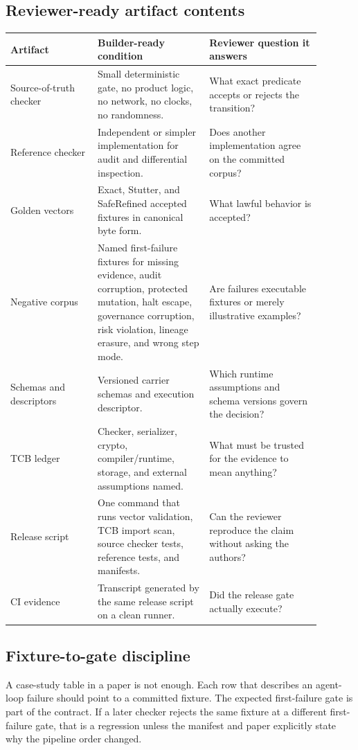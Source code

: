 \documentclass[11pt,oneside]{article}
\begin{document}
\subsection{Reviewer-ready artifact contents}
\begin{longtable}{@{}p{0.25\linewidth}p{0.32\linewidth}p{0.32\linewidth}@{}}
\toprule
\textbf{Artifact} & \textbf{Builder-ready condition} & \textbf{Reviewer question it answers} \\
\midrule
Source-of-truth checker & Small deterministic gate, no product logic, no network, no clocks, no randomness. & What exact predicate accepts or rejects the transition? \\
Reference checker & Independent or simpler implementation for audit and differential inspection. & Does another implementation agree on the committed corpus? \\
Golden vectors & Exact, Stutter, and SafeRefined accepted fixtures in canonical byte form. & What lawful behavior is accepted? \\
Negative corpus & Named first-failure fixtures for missing evidence, audit corruption, protected mutation, halt escape, governance corruption, risk violation, lineage erasure, and wrong step mode. & Are failures executable fixtures or merely illustrative examples? \\
Schemas and descriptors & Versioned carrier schemas and execution descriptor. & Which runtime assumptions and schema versions govern the decision? \\
TCB ledger & Checker, serializer, crypto, compiler/runtime, storage, and external assumptions named. & What must be trusted for the evidence to mean anything? \\
Release script & One command that runs vector validation, TCB import scan, source checker tests, reference tests, and manifests. & Can the reviewer reproduce the claim without asking the authors? \\
CI evidence & Transcript generated by the same release script on a clean runner. & Did the release gate actually execute? \\
\bottomrule
\end{longtable}

\subsection{Fixture-to-gate discipline}
A case-study table in a paper is not enough. Each row that describes an agent-loop failure should point to a committed fixture. The expected first-failure gate is part of the contract. If a later checker rejects the same fixture at a different first-failure gate, that is a regression unless the manifest and paper explicitly state why the pipeline order changed.
\end{document}
